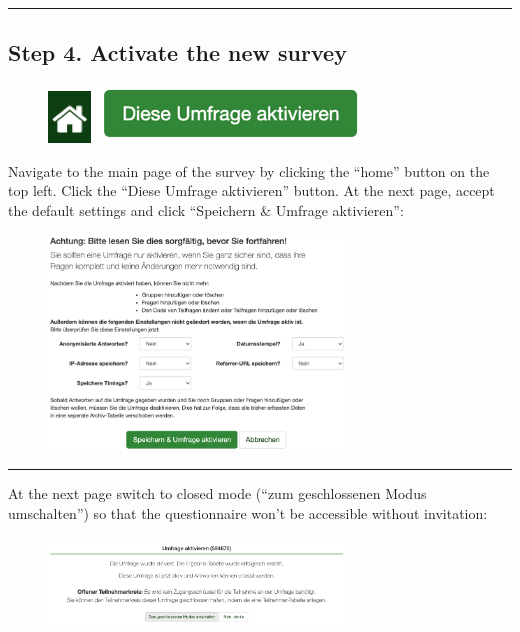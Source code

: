 \par\noindent\rule{\textwidth\color{pniblue}}{0.4pt}
\subsection*{Step 4. Activate the new survey}

\begin{figure}
\centering
\includegraphics{docs/fig/ls_sop4_home.png}
\includegraphics{docs/fig/ls_sop4_button.png}
\end{figure}

Navigate to the main page of the survey by clicking the “home” button on the top left. Click the “Diese Umfrage aktivieren” button. At the next page, accept the default settings and click “Speichern & Umfrage aktivieren”:

\begin{figure}[H]
\includegraphics[width=0.7\textwidth]{docs/fig/ls_sop_4.png}
\end{figure}

\par\noindent\rule{\textwidth\color{pniblue}}{0.4pt}
At the next page switch to closed mode (“zum geschlossenen Modus umschalten”) so that the questionnaire won’t be accessible without invitation:

\begin{figure}[H]
\includegraphics[width=0.7\textwidth]{docs/fig/ls_sop4.1.png}
\end{figure}

